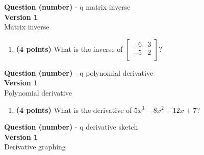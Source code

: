 \documentclass[12pt]{amsart}
\begin{document}
\graphicspath{{C:/Users/iainc/anaconda3/Randomizer/MATH 1001/Midterm 1/}}{\Large{\bf Question (number)}} - q matrix inverse\\ $ $ \\ {\bf Version 1} \\ 
Matrix inverse
\begin{enumerate}[resume]
\item {\bf (4 points)} 
 What is the inverse of $\left[ \begin{array}{cc}
\a & \b \\
\c & \d \\ \end{array} \right]$?

\vfill 
 \end{enumerate}\newpage\def \a{5}\def \athree{15}\def \b{-8}\def \btwo{-16}\def \c{-12}\def \d{7}\def \poly{5x^{3}-8x^{2}-12x^{}+7}\def \polydif{15x^{2}-16x^{}-12}{\Large{\bf Question (number)}} - q polynomial derivative\\ $ $ \\ {\bf Version 1} \\ 
Polynomial derivative
\begin{enumerate}[resume]
\item {\bf (4 points)} 
 What is the derivative of $\poly$?

\vfill 
 \end{enumerate}\newpage\def \a{-4}\def \b{1}\def \c{4}\def \shift{-1}\def \upside{1}\def \discr{196}\def \highone{-2.0}\def \hightwo{2.6666666666666665}\def \scale{36.0}\def \scalef{0.10555555555555556}\def \difb{2}\def \difc{-16}{\Large{\bf Question (number)}} - q derivative sketch\\ $ $ \\ {\bf Version 1} \\ 
Derivative graphing
\end{document}
